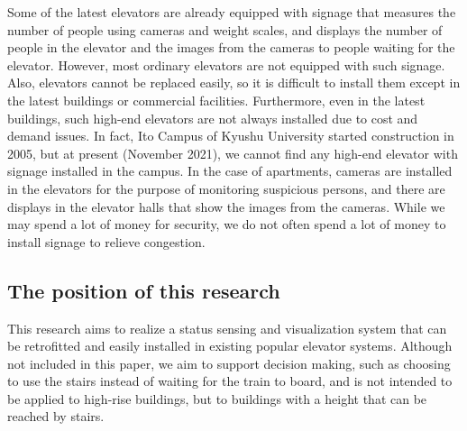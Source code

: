Some of the latest elevators are already equipped with signage that measures the number of people using cameras and weight scales, and displays the number of people in the elevator and the images from the cameras to people waiting for the elevator. However, most ordinary elevators are not equipped with such signage. Also, elevators cannot be replaced easily, so it is difficult to install them except in the latest buildings or commercial facilities. Furthermore, even in the latest buildings, such high-end elevators are not always installed due to cost and demand issues. In fact, Ito Campus of Kyushu University started construction in 2005, but at present (November 2021), we cannot find any high-end elevator with signage installed in the campus. In the case of apartments, cameras are installed in the elevators for the purpose of monitoring suspicious persons, and there are displays in the elevator halls that show the images from the cameras. While we may spend a lot of money for security, we do not often spend a lot of money to install signage to relieve congestion.


\subsection{The position of this research}

This research aims to realize a status sensing and visualization system that can be retrofitted and easily installed in existing popular elevator systems. Although not included in this paper, we aim to support decision making, such as choosing to use the stairs instead of waiting for the train to board, and is not intended to be applied to high-rise buildings, but to buildings with a height that can be reached by stairs.
